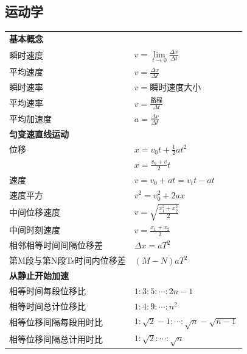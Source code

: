 \subsection{运动学}
\begin{tabularx}{\columnwidth}{XX}
  \multicolumn{2}{l}{\textbf{基本概念}}                                   \\
  瞬时速度            & $v=\lim\limits_{t\to0} \frac{\Delta x}{\Delta t}$ \\
  平均速度            & $v=\frac{\Delta x}{\Delta t}$                     \\
  瞬时速率            & $v=$瞬时速度大小                                        \\
  平均速率            & $v=\frac{\text{路程}}{\Delta t}$                    \\
  平均加速度           & $a=\frac{\Delta v}{\Delta t}$                     \\
  \multicolumn{2}{l}{\textbf{匀变速直线运动}}                                \\
  位移              & $x=v_0t+\frac{1}{2}at^2$                          \\
                  & $x=\frac{v_0+v}{2}t$                              \\
  速度              & $v=v_0+at=v_tt-at$                                \\
  速度平方            & $v^2=v_0^2+2ax$                                   \\
  中间位移速度          & $v=\sqrt{\frac{x_1^2+x_2^2}2}$                    \\
  中间时刻速度          & $v=\frac{x_1+x_2}{2}$                             \\
  相邻相等时间间隔位移差     & $\Delta x=aT^2$                                   \\
  第M段与第N段Ts时间内位移差 & $(M-N)aT^2$                                       \\
  \multicolumn{2}{l}{\textbf{从静止开始加速}}                                \\
  相等时间每段位移比       & $1:3:5:\cdots:2n-1$                               \\
  相等时间总计位移比       & $1:4:9:\cdots:n^2$                                \\
  相等位移间隔每段用时比     & $1:\sqrt2-1:\cdots:\sqrt n-\sqrt{n-1}$            \\
  相等位移间隔总计用时比     & $1:\sqrt2:\cdots:\sqrt n$                         \\
\end{tabularx}
